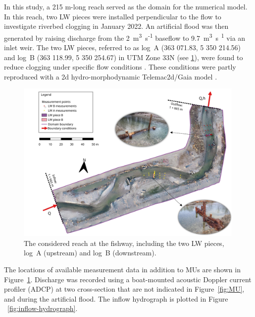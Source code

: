 \documentclass[draft,linenumbers,onecolumn]{agujournal2019} %
\begin{document}
In this study, a 215 m-long reach served as the domain for the numerical model. In this reach, two LW pieces were installed perpendicular to the flow to investigate riverbed clogging in  January 2022. An artificial flood was then generated by raising discharge from the 2~m\textsuperscript{3}~s\textsuperscript{-1} baseflow to 9.7~m\textsuperscript{3}~s\textsuperscript{~1} via an inlet weir. The two LW pieces, referred to as log~A (363 071.83, 5 350 214.56) and log~B (363 118.99, 5 350 254.67) in UTM Zone 33N (see \ref{fig:study-area}), were found to reduce clogging under specific flow conditions \cite{schwindt2023fuzzylogic,schalko2021flow,schalko2024flow}. These conditions were partly reproduced with a 2d hydro-morphodynamic Telemac2d/Gaia model \cite{scolari2025hydromorphodynamic}.



\begin{figure}[htbp]
	\centering
	\includegraphics[width=0.99\textwidth]{1_study-area.jpg}
	\caption{The considered reach at the fishway, including the two LW pieces, log~A (upstream) and log~B (downstream).	}
	\label{fig:study-area}
\end{figure}

The locations of available measurement data in addition to MUs are shown in Figure~\ref{fig:study-area}. Discharge was recorded using a boat-mounted acoustic Doppler current profiler (ADCP) at two cross-section that are not indicated in Figure~\ref{fig:MU}, and during the artificial flood. The inflow hydrograph is plotted in Figure ~\ref{fig:inflow-hydrograph}.
\end{document}
